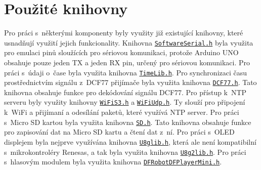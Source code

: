 \section{Použité knihovny}
Pro práci s~některými komponenty byly využity již existující knihovny, které usnadňují využití jejich funkcionality. Knihovna \href{https://www.arduino.cc/en/Reference/SoftwareSerial}{\texttt{SoftwareSerial.h}} byla využita pro emulaci pinů sloužících pro sériovou komunikaci, protože Arduino UNO obsahuje pouze jeden TX a jeden RX pin, určený pro sériovou komunikaci. Pro práci s~údaji o~čase byla využita knihovna \href{https://www.pjrc.com/teensy/td_libs_Time.html}{\texttt{TimeLib.h}}. Pro synchronizaci času prostřednictvím signálu z~DCF77 přijímače byla využita knihovna \href{https://github.com/thijse/Arduino-DCF77}{\texttt{DCF77.h}}. Tato knihovna obsahuje funkce pro dekódování signálu DCF77. Pro přístup k~NTP serveru byly využity knihovny \href{https://github.com/esp8266/Arduino/tree/master/libraries/ESP8266WiFi}{\texttt{WiFiS3.h}} a \href{https://www.arduino.cc/en/Reference/WiFi}{\texttt{WiFiUdp.h}}. Ty slouží pro připojení k~WiFi a přijímaní a odesílání paketů, které využívá NTP server. Pro práci s~Micro SD kartou byla využita knihovna \href{https://www.arduino.cc/en/Reference/SD}{\texttt{SD.h}}. Tato knihovna obsahuje funkce pro zapisování dat na Micro SD kartu a čtení dat z~ní. Pro práci s~OLED displejem byla nejprve využívána knihovna \href{https://github.com/olikraus/u8glib}{\texttt{U8glib.h}}, která ale není kompatibilní s~mikrokontroléry Renesas, a tak byla využita knihovna \href{https://github.com/olikraus/u8g2}{\texttt{U8g2lib.h}}. Pro práci s~hlasovým modulem byla využita knihovna \href{https://github.com/DFRobot/DFRobotDFPlayerMini}{\texttt{DFRobotDFPlayerMini.h}}.

